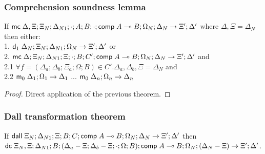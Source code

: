 \subsubsection{Comprehension soundness lemma}

If $\mathsf{mc} \; \Delta, \Xi; \Xi_N; \Delta_{N1}; \cdot; A; B; \cdot; \mathsf{comp} \; A \multimap B; \Omega_N; \Delta_N \rightarrow \Xi'; \Delta'$ where $\Delta, \Xi = \Delta_N$ then either:\\
1. \hspace{1cm} $\mathsf{d}_1 \; \Delta_N; \Xi_N; \Delta_{N1}; \Omega_N \rightarrow \Xi'; \Delta'$ or \\
2. \hspace{1cm} $\mathsf{mc} \; \Delta; \Xi_N; \Delta_{N1}; \Xi; \cdot; B; C'; \mathsf{comp} \; A \multimap B; \Omega_N; \Delta_N \rightarrow \Xi'; \Delta'$ and \\
2.1 \hspace{2cm} $\forall f = (\Delta_a; \Delta_b; \Xi_a; \Omega; B) \in C'. \Delta_a, \Delta_b, \Xi = \Delta_N$ and \\
2.2 \hspace{2cm} $\mathsf{m}_0 \; \Delta_1; \Omega_1 \rightarrow \Delta_1$ ... $\mathsf{m}_0 \; \Delta_n; \Omega_n \rightarrow \Delta_n$\\

\begin{proof}
Direct application of the previous theorem.
\end{proof}

\subsubsection{Dall transformation theorem}

If $\mathsf{dall} \; \Xi_N; \Delta_{N1}; \Xi; B; C; \mathsf{comp} \; A \multimap B; \Omega_N; \Delta_N \rightarrow \Xi'; \Delta'$ then\\
$\mathsf{dc} \; \Xi_N, \Xi; \Delta_{N1}; B; (\Delta_a - \Xi; \Delta_b - \Xi; \cdot; \Omega; B); \mathsf{comp} \; A \multimap B; \Omega_N; (\Delta_N - \Xi) \rightarrow \Xi'; \Delta'$.


